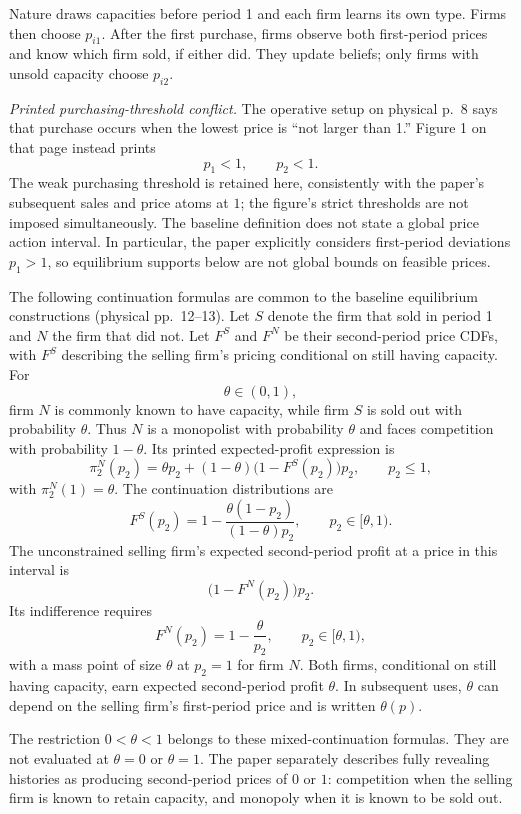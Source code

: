 \documentclass{article}
\begin{document}
Nature draws capacities before period 1 and each firm learns its own type. Firms then choose $p_{i1}$. After the first purchase, firms observe both first-period prices and know which firm sold, if either did. They update beliefs; only firms with unsold capacity choose $p_{i2}$.

\emph{Printed purchasing-threshold conflict.} The operative setup on physical p.~8 says that purchase occurs when the lowest price is ``not larger than 1.'' Figure 1 on that page instead prints
\[
p_1<1,\qquad p_2<1.
\]
The weak purchasing threshold is retained here, consistently with the paper's subsequent sales and price atoms at $1$; the figure's strict thresholds are not imposed simultaneously. The baseline definition does not state a global price action interval. In particular, the paper explicitly considers first-period deviations $p_1>1$, so equilibrium supports below are not global bounds on feasible prices.

The following continuation formulas are common to the baseline equilibrium constructions (physical pp.~12--13). Let $S$ denote the firm that sold in period 1 and $N$ the firm that did not. Let $F^{S}$ and $F^{N}$ be their second-period price CDFs, with $F^{S}$ describing the selling firm's pricing conditional on still having capacity. For
\[
\theta\in(0,1),
\]
firm $N$ is commonly known to have capacity, while firm $S$ is sold out with probability $\theta$. Thus $N$ is a monopolist with probability $\theta$ and faces competition with probability $1-\theta$. Its printed expected-profit expression is
\[
\pi_2^{N}(p_2)
 =\theta p_2+(1-\theta)\bigl(1-F^{S}(p_2)\bigr)p_2,
\qquad p_2\leq 1,
\]
with $\pi_2^{N}(1)=\theta$. The continuation distributions are
\begin{equation}
F^{S}(p_2)=1-\frac{\theta(1-p_2)}{(1-\theta)p_2},
\qquad p_2\in[\theta,1).
\tag{1}
\end{equation}
The unconstrained selling firm's expected second-period profit at a price in this interval is
\[
\bigl(1-F^{N}(p_2)\bigr)p_2.
\]
Its indifference requires
\begin{equation}
F^{N}(p_2)=1-\frac{\theta}{p_2},
\qquad p_2\in[\theta,1),
\tag{2}
\end{equation}
with a mass point of size $\theta$ at $p_2=1$ for firm $N$. Both firms, conditional on still having capacity, earn expected second-period profit $\theta$. In subsequent uses, $\theta$ can depend on the selling firm's first-period price and is written $\theta(p)$.

The restriction $0<\theta<1$ belongs to these mixed-continuation formulas. They are not evaluated at $\theta=0$ or $\theta=1$. The paper separately describes fully revealing histories as producing second-period prices of $0$ or $1$: competition when the selling firm is known to retain capacity, and monopoly when it is known to be sold out.
\end{document}
